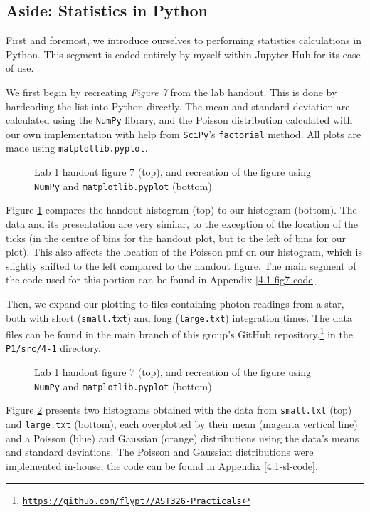 \documentclass[preprint2]{aastex702}
\begin{document}
		\subsection{Aside: Statistics in Python}\label{ssec:4.1}
			
			First and foremost, we introduce ourselves to performing statistics calculations in Python. This segment is coded entirely by myself within Jupyter Hub for its ease of use.

			We first begin by recreating \textit{Figure 7} from the lab handout. This is done by hardcoding the list into Python directly. The mean and standard deviation are calculated using the \texttt{NumPy} library, and the Poisson distribution calculated with our own implementation with help from \texttt{SciPy}'s \texttt{factorial} method. All plots are made using \texttt{matplotlib.pyplot}.
			
			\begin{figure}
				\caption{Lab 1 handout figure 7 (top), and recreation of the figure using \texttt{NumPy} and \texttt{matplotlib.pyplot} (bottom)}
				\label{fig:hist-recr}
			\end{figure}
			
			Figure \ref{fig:hist-recr} compares the handout histogram (top) to our histogram (bottom). The data and its presentation are very similar, to the exception of the location of the ticks (in the centre of bins for the handout plot, but to the left of bins for our plot). This also affects the location of the Poisson pmf on our histogram, which is slightly shifted to the left compared to the handout figure. The main segment of the code used for this portion can be found in Appendix \ref{4.1-fig7-code}.

			Then, we expand our plotting to files containing photon readings from a star, both with short (\texttt{small.txt}) and long (\texttt{large.txt}) integration times. The data files can be found in the main branch of this group's GitHub repository,\footnote{\texttt{\href{https://github.com/flypt7/AST326-Practicals}{https://github.com/flypt7/AST326-Practicals}}} in the \texttt{P1/src/4-1} directory.

			\begin{figure}
				\caption{Lab 1 handout figure 7 (top), and recreation of the figure using \texttt{NumPy} and \texttt{matplotlib.pyplot} (bottom)}
				\label{fig:4.1-sl}
			\end{figure}

			Figure \ref{fig:4.1-sl} presents two histograms obtained with the data from \texttt{small.txt} (top) and \texttt{large.txt} (bottom), each overplotted by their mean (magenta vertical line) and a Poisson (blue) and Gaussian (orange) distributions using the data's means and standard deviations. The Poisson and Gaussian distributions were implemented in-house; the code can be found in Appendix \ref{4.1-sl-code}.
\end{document}
